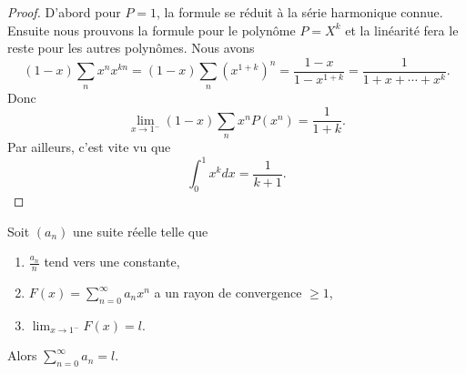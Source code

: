 \begin{proof}
    D'abord pour \( P=1\), la formule se réduit à la série harmonique connue. Ensuite nous prouvons la formule pour le polynôme \( P=X^k\) et la linéarité fera le reste pour les autres polynômes. Nous avons
    \begin{equation}
        (1-x)\sum_nx^nx^{kn}=(1-x)\sum_n(x^{1+k})^n=\frac{ 1-x }{ 1-x^{1+k} }=\frac{1}{ 1+x+\cdots+x^k }.
    \end{equation}
    Donc
    \begin{equation}
        \lim_{x\to 1^-} (1-x)\sum_nx^nP(x^n)=\frac{1}{ 1+k }.
    \end{equation}
    Par ailleurs, c'est vite vu que
    \begin{equation}
        \int_0^1 x^kdx=\frac{1}{ k+1 }.
    \end{equation}
\end{proof}

\begin{theorem}      \label{ThoPdDxgP}
    Soit \( (a_n)\) une suite réelle telle que
    \begin{enumerate}
        \item
            \( \frac{ a_n }{ n }\) tend vers une constante,
        \item
            \( F(x)=\sum_{n=0}^{\infty}a_nx^n\) a un rayon de convergence \( \geq 1\),
        \item
            \( \lim_{x\to 1^-} F(x)=l\).
    \end{enumerate}
    Alors \( \sum_{n=0}^{\infty}a_n=l\).
\end{theorem}

